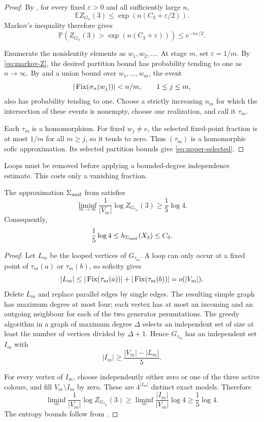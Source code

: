 \begin{proof}
By , for every fixed $\varepsilon>0$ and all sufficiently
large $n$,
\[
 \mathbb E Z_{G_n}(3)\le\exp(n(C_3+\varepsilon/2)).
\]
Markov's inequality therefore gives
\begin{equation}\label{eq:markov-Z}
 \mathbb P\left(Z_{G_n}(3)>\exp(n(C_3+\varepsilon))\right)
 \le e^{-n\varepsilon/2}.
\end{equation}

Enumerate the nonidentity elements as $w_1,w_2,\ldots$.  At stage $m$, set
$\varepsilon=1/m$.  By \eqref{eq:markov-Z}, the desired partition bound has
probability tending to one as $n\to\infty$.  By  and a
union bound over $w_1,\ldots,w_m$, the event
\[
 |\operatorname{Fix}(\sigma_n(w_j))|<n/m,
 \qquad 1\le j\le m,
\]
also has probability tending to one.  Choose a strictly increasing $n_m$ for
which the intersection of these events is nonempty, choose one realization,
and call it $\tau_m$.

Each $\tau_m$ is a homomorphism.  For fixed $w_j\ne e$, the selected
fixed-point fraction is at most $1/m$ for all $m\ge j$, so it tends to zero.
Thus $(\tau_m)$ is a homomorphic sofic approximation.  Its selected
partition bounds give \eqref{eq:upper-selected}.
\end{proof}

Loops must be removed before applying a bounded-degree independence estimate.
This costs only a vanishing fraction.

\begin{proposition}\label{prop:positive}
The approximation $\Sigma_{\mathrm{unif}}$ from  satisfies
\[
 \liminf_{m\to\infty}\frac1{|V_m|}
 \log Z_{G_{\tau_m}}(3)\ge\frac15\log4.
\]
Consequently,
\[
 \frac15\log4
 \le h_{\Sigma_{\mathrm{unif}}}(X_3)\le C_3.
\]
\end{proposition}

\begin{proof}
Let $L_m$ be the looped vertices of $G_{\tau_m}$.  A loop can only occur at a
fixed point of $\tau_m(a)$ or $\tau_m(b)$, so soficity gives
\[
 |L_m|
 \le |\operatorname{Fix}(\tau_m(a))|+|\operatorname{Fix}(\tau_m(b))|
 =o(|V_m|).
\]
Delete $L_m$ and replace parallel edges by single edges.  The resulting
simple graph has maximum degree at most four: each vertex has at most an
incoming and an outgoing neighbour for each of the two generator
permutations.  The greedy algorithm in a graph of maximum degree $\Delta$
selects an independent set of size at least the number of vertices divided by
$\Delta+1$.  Hence $G_{\tau_m}$ has an independent set $I_m$ with
\[
 |I_m|\ge\frac{|V_m|-|L_m|}{5}.
\]

For every vertex of $I_m$, choose independently either zero or one of the
three active colours, and fill $V_m\setminus I_m$ by zero.  These are
$4^{|I_m|}$ distinct exact models.  Therefore
\[
 \liminf_m\frac1{|V_m|}\log Z_{G_{\tau_m}}(3)
 \ge\liminf_m\frac{|I_m|}{|V_m|}\log4
 \ge\frac15\log4.
\]
The entropy bounds follow from .
\end{proof}

